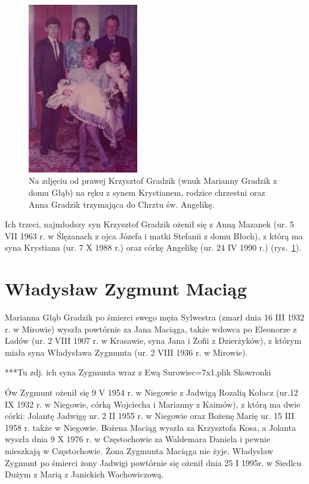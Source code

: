 \begin{figure}[!h]
\begin{center}
\includegraphics[width=0.43\textwidth]{zdjecia/chrzest_angeliki_gradzik.jpg}
\caption[Chrzest św. Angeliki Gradzik]{Na zdjęciu od prawej Krzysztof Gradzik (wnuk Marianny Gradzik z domu Głąb) na ręku z synem Krystianem, rodzice chrzestni oraz Anna Gradzik trzymająca do Chrztu św. Angelikę.}
\label{rys:chrzest_angeliki_gradzik}
\end{center}
\end{figure}

Ich trzeci, najmłodszy syn Krzysztof Gradzik ożenił się z Anną Mazanek (ur. 5 VII 1963 r. w Ślęzanach z ojca Józefa i matki Stefanii z domu Błoch), z którą ma syna Krystiana (ur. 7 X 1988 r.) oraz córkę Angelikę (ur. 24 IV 1990 r.) (rys.~\ref{rys:chrzest_angeliki_gradzik}).




\section{Władysław Zygmunt Maciąg}
Marianna Głąb Gradzik po śmierci swego męża Sylwestra (zmarł dnia 16 III  1932 r. w Mirowie) wyszła powtórnie za Jana Maciąga, także wdowca po Eleonorze z Ladów (ur. 2 VIII 1907 r. w Krasawie, syna Jana i Zofii z Dzierżyków), z którym miała syna Władysława Zygmunta (ur. 2 VIII 1936 r. w Mirowie).

{\color{red}
***Tu zdj. ich syna Zygmunta wraz z Ewą Surowiec=7x1,plik Skowronki}


Ów Zygmunt ożenił się 9 V 1954 r. w Niegowie z Jadwigą Rozalią Kołacz (ur.12 IX 1932 r. w Niegowie, córką Wojciecha i Marianny z Kaimów), z którą ma dwie córki: Jolantę Jadwigę ur. 2 II 1955 r. w Niegowie oraz Bożenę Marię ur. 15 III 1958 r. także w Niegowie. Bożena Maciąg wyszła za Krzysztofa Kosa, a Jolanta wyszła dnia 9 X 1976 r. w Częstochowie za Waldemara Daniela i pewnie mieszkają w Częstochowie. Żona Zygmunta Maciąga nie żyje. Władysław Zygmunt po śmierci żony Jadwigi powtórnie się ożenił dnia 25 I 1995r. w Siedlcu Dużym z Marią z Janickich Wachowiczową.

